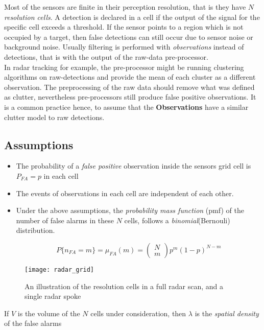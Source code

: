 Most of the sensors are finite in their perception resolution, that is they have $N$  \emph{resolution cells}. A detection is declared in a cell if  the output of the signal for the specific cell exceeds a threshold. If the sensor points to a region which is not occupied by a target, then false detections can still occur  due to sensor noise or background noise. Usually filtering is performed with \emph{observations} instead of detections, that is with the output of the raw-data pre-processor.\\

In radar tracking for example, the pre-processor might be running clustering algorithms on raw-detections and provide the mean of each cluster as a different observation. The preprocessing of the raw data should remove what was defined as clutter, nevertheless pre-processors still produce false positive observations. It is a common practice hence, to assume that the \textbf{Observations} have a similar clutter model to raw detections.

\subsection{Assumptions}

\begin{itemize}
	\item The probability of a \emph{false positive} observation inside the sensors grid cell is $P_{FA} = p$ in each cell
	\item The events of observations in each cell are independent of each other.
	\item 
	Under the above assumptions, the \emph{probability mass function} (pmf) of the number of false alarms in these $N$ cells, follows a \emph{binomial}(Bernouli) distribution.
	
	$$
	P\{n_{FA}=m\} = \mu_{FA}(m) = \begin{pmatrix}N \\m \end{pmatrix} p^m (1-p)^{N-m}
	$$
\end{itemize}
\begin{figure}[H]
	\centering
	\texttt{[image: radar\_grid]}
	\caption{An illustration of the resolution cells in a full radar scan, and a single radar spoke\cite{Wilthil2017}}
	\label{fig:radargrid}
\end{figure}

If $V$ is the volume of the $N$ cells under consideration, then $\lambda$ is the \emph{spatial density }of the false alarms


